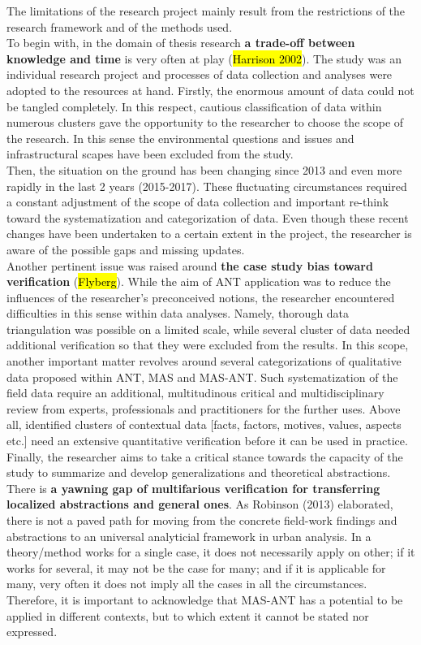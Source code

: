 \documentclass[11pt]{report}
\begin{document}
The limitations of the research project mainly result from the restrictions of the research framework and of the methods used.
\\
To begin with, in the domain of thesis research \textbf{a trade-off between knowledge and time} is very often at play (\hl{Harrison 2002}).
The study was an individual research project and processes of data collection and analyses were adopted to the resources at hand.
Firstly, the enormous amount of data could not be tangled completely. In this respect, cautious classification of data within numerous clusters gave the opportunity to the researcher to choose the scope of the research.
In this sense the environmental questions and issues and infrastructural scapes have been excluded from the study.
\\
Then, the situation on the ground has been changing since 2013 and even more rapidly in the last 2 years (2015-2017).
These fluctuating circumstances required a constant adjustment of the scope of data collection and important re-think toward the systematization and categorization of data.
Even though these recent changes have been undertaken to a certain extent in the project, the researcher is aware of the possible gaps and missing updates.
\\
Another pertinent issue was raised around \textbf{the case study bias toward verification} (\hl{Flyberg}).
While the aim of ANT application was to reduce the influences of the researcher's preconceived notions, the researcher encountered difficulties in this sense within data analyses.
Namely, thorough data triangulation was possible on a limited scale, while several cluster of data needed additional verification so that they were excluded from the results.
In this scope, another important matter revolves around several categorizations of qualitative data proposed within ANT, MAS and MAS-ANT. 
Such systematization of the field data require an additional, multitudinous critical and multidisciplinary review from experts, professionals and practitioners for the further uses.
Above all, identified clusters of contextual data [facts, factors, motives, values, aspects etc.] need an extensive quantitative verification before it can be used in practice.
\\
Finally, the researcher aims to take a critical stance towards the capacity of the study to summarize and develop generalizations and theoretical abstractions.
There is \textbf{a yawning gap of multifarious verification for transferring localized abstractions and general ones}.
As Robinson (2013) elaborated, there is not a paved path for moving from the concrete field-work findings and abstractions to an universal analyticial framework in urban analysis. In a theory/method works for a single case, it does not necessarily apply on other; if it works for several, it may not be the case for many; and if it is applicable for many, very often it does not imply all the cases in all the circumstances.
Therefore, it is important to acknowledge that MAS-ANT has a potential to be applied in different contexts, but to which extent it cannot be stated nor expressed.
\end{document}
